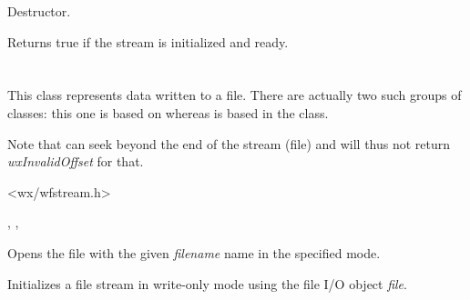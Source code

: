 Destructor.

\label{wxffileinputstreamisok}


Returns true if the stream is initialized and ready.

\section{}\label{wxffileoutputstream}

This class represents data written to a file. There are actually
two such groups of classes: this one is based on  
whereas  is based in
the  class.

Note that  
can seek beyond the end of the stream (file) and will thus not return 
{\it wxInvalidOffset} for that.




<wx/wfstream.h>


, , 


\label{wxffileoutputstreamctor}


Opens the file with the given {\it filename} name in the specified mode.


Initializes a file stream in write-only mode using the file I/O object {\it file}.


